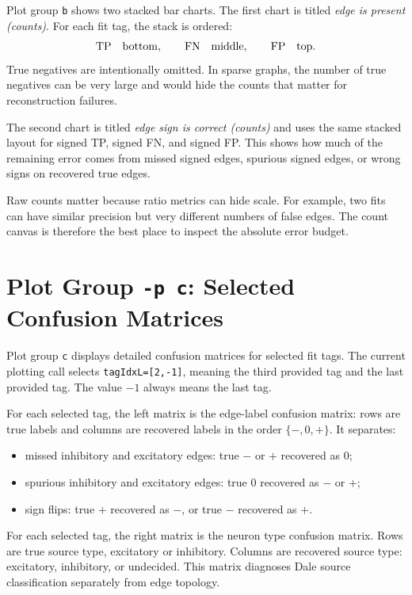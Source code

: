 \documentclass[11pt]{article}
\begin{document}
Plot group \texttt{b} shows two stacked bar charts. The first chart is titled
\textit{edge is present (counts)}. For each fit tag, the stack is ordered:
\[
  \mathrm{TP}\quad \hbox{bottom}, \qquad
  \mathrm{FN}\quad \hbox{middle}, \qquad
  \mathrm{FP}\quad \hbox{top}.
\]
True negatives are intentionally omitted. In sparse graphs, the number of
true negatives can be very large and would hide the counts that matter for
reconstruction failures.

The second chart is titled \textit{edge sign is correct (counts)} and uses
the same stacked layout for signed TP, signed FN, and signed FP. This shows
how much of the remaining error comes from missed signed edges, spurious
signed edges, or wrong signs on recovered true edges.

Raw counts matter because ratio metrics can hide scale. For example, two
fits can have similar precision but very different numbers of false edges.
The count canvas is therefore the best place to inspect the absolute error
budget.

\section{Plot Group \texttt{-p c}: Selected Confusion Matrices}
\label{sec:plot-c}

Plot group \texttt{c} displays detailed confusion matrices for selected fit
tags. The current plotting call selects \texttt{tagIdxL=[2,-1]}, meaning the
third provided tag and the last provided tag. The value \(-1\) always means
the last tag.

For each selected tag, the left matrix is the edge-label confusion matrix:
rows are true labels and columns are recovered labels in the order
\(\{-,0,+\}\). It separates:
\begin{itemize}
  \item missed inhibitory and excitatory edges: true \(-\) or \(+\) recovered
  as \(0\);
  \item spurious inhibitory and excitatory edges: true \(0\) recovered as
  \(-\) or \(+\);
  \item sign flips: true \(+\) recovered as \(-\), or true \(-\) recovered as
  \(+\).
\end{itemize}

For each selected tag, the right matrix is the neuron type confusion matrix.
Rows are true source type, excitatory or inhibitory. Columns are recovered
source type: excitatory, inhibitory, or undecided. This matrix diagnoses
Dale source classification separately from edge topology.
\end{document}
